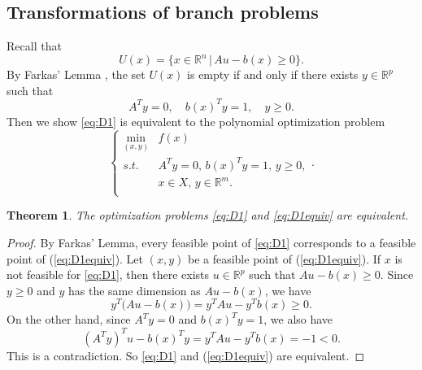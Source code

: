 \documentclass{amsart}
\newcommand{\reff}[1]{(\ref{#1})}
\newtheorem{theorem}{Theorem}[section]
\theoremstyle{plain}
\newcommand{\re}{\mathbb{R}}
\newcommand{\st}{\mathit{s.t.}}
\numberwithin{equation}{section}
\begin{document}
		\subsection{Transformations of branch problems}
		\label{sc:transbp}	
		Recall that 
		\[
		U(x) = \{x\in\re^n\,\vert\, Au-b(x)\ge 0\}.
		\]
		By Farkas' Lemma \cite{Ziegler}, the set $U(x)$ is empty if and only if 
		there exists $y\in\re^p$ such that 
		\[ A^Ty=0,\quad b(x)^Ty=1,\quad y\ge 0.\]
		Then we show \eqref{eq:D1} is equivalent to the polynomial optimization problem
		\begin{equation}\label{eq:D1equiv}
			\left\{\begin{array}{ll}
				\min\limits_{(x,y)} & f(x)\\
				\st & A^Ty=0,\, b(x)^Ty=1,\, y\ge 0,\\
				& x\in X,\, y\in\re^m.\\
			\end{array}.
			\right.
		\end{equation} 
		\begin{theorem}\label{thm:D1equiv}
			The optimization problems \eqref{eq:D1} and \eqref{eq:D1equiv} are equivalent.
		\end{theorem}
		\begin{proof}
		By Farkas' Lemma, every feasible point of \eqref{eq:D1} corresponds to a feasible point of \reff{eq:D1equiv}.
		Let $(x,y)$ be a feasible point of \reff{eq:D1equiv}.
		If $x$ is not feasible for \eqref{eq:D1}, then there exists $u\in\re^p$ such that 
		$Au- b(x)\ge 0$. Since $y\ge 0$ and $y$ has the same dimension as $Au-b(x)$, 
		we have
		\[
		y^T\big(Au-b(x)\big) = y^TAu-y^Tb(x)\ge 0.
		\]
		On the other hand, since $A^Ty = 0$ and $b(x)^Ty = 1$, we also have 
		\[ (A^Ty)^Tu-b(x)^Ty = y^TAu -y^Tb(x) = -1<0. \]
		This is a contradiction. So \eqref{eq:D1} and \reff{eq:D1equiv} are equivalent.
		\end{proof}
		
\end{document}

